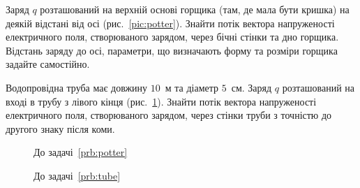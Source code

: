 \documentclass[]{ProblemBook}
\begin{document}


\begin{problem}\label{prb:potter}
Заряд $q$ розташований на верхній основі горщика (там, де мала бути кришка) на деякій відстані від осі (рис.~\ref{pic:potter}). Знайти потік вектора
напруженості електричного поля, створюваного зарядом, через бічні стінки та дно горщика. Відстань заряду до осі, параметри, що визначають форму та
розміри горщика задайте самостійно.
\end{problem}


\begin{problem}\label{prb:tube}
Водопровідна труба має довжину $10$~м та діаметр $5$~см. Заряд $q$ розташований на вході в трубу з лівого кінця (рис.~\ref{pic:tube}).
Знайти потік вектора напруженості електричного поля, створюваного зарядом, через стінки труби з точністю до другого знаку після коми.
\end{problem}

\begin{figure}[h!]\centering
\begin{minipage}[t]{0.45\linewidth}\centering
{}
\caption{До задачі~\ref{prb:potter}}
\label{pic:potter}
\end{minipage}
\begin{minipage}[t]{0.45\linewidth}\centering
\caption{До задачі~\ref{prb:tube}}
\label{pic:tube}
\end{minipage}
\end{figure}
\end{document}
